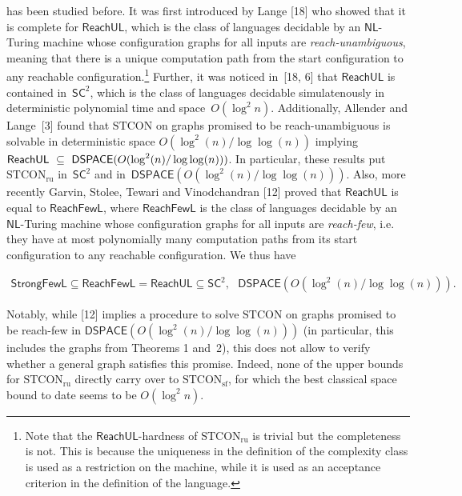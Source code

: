 has been studied before.
It was first introduced by Lange [18] who showed that it is complete for $\mathsf{ReachUL}$, which is the class of languages decidable by an $\mathsf{NL}$-Turing machine whose configuration graphs for all inputs are \emph{reach-unambiguous}, meaning that there is a unique computation path from the start configuration to any reachable configuration.\footnote{Note that the $\mathsf{ReachUL}$-hardness of $\mathrm{STCON}_{\mathrm{ru}}$ is trivial but the completeness is not. This is because the uniqueness in the definition of the complexity class is used as a restriction on the machine, while it is used as an acceptance criterion in the definition of the language.}
Further, it was noticed in [18, 6] that $\mathsf{ReachUL}$ is contained in $\mathsf{SC}^{2}$, which is the class of languages decidable simulatenously in deterministic polynomial time and space $O(\log^{2}n)$.
Additionally, Allender and Lange [3] found that $\mathrm{STCON}$ on graphs promised to be reach-unambiguous is solvable in deterministic space $O(\log^{2}(n)/\log\log(n))$ implying $\mathsf{ReachUL}\nobreak\ \subseteq\nobreak\ \mathsf{DSPACE}(O(\log^{2}(n)/\log\log(n)))$.
In particular, these results put $\mathrm{STCON}_{\mathrm{ru}}$ in $\mathsf{SC}^{2}$ and in $\mathsf{DSPACE}(O(\log^{2}(n)/\log\log(n)))$.
Also, more recently Garvin, Stolee, Tewari and Vinodchandran [12] proved that $\mathsf{ReachUL}$ is equal to $\mathsf{ReachFewL}$, where $\mathsf{ReachFewL}$ is the class of languages decidable by an $\mathsf{NL}$-Turing machine whose configuration graphs for all inputs are \emph{reach-few}, i.e. they have at most polynomially many computation paths from its start configuration to any reachable configuration.
We thus have\par


\[\begin{gathered}
\displaystyle\mathsf{StrongFewL}\subseteq\mathsf{ReachFewL}=\mathsf{ReachUL}\subseteq\mathsf{SC}^{2},\text{ }\mathsf{DSPACE}(O(\log^{2}(n)/\log\log(n))).
\end{gathered}\]


Notably, while [12] implies a procedure to solve $\mathrm{STCON}$ on graphs promised to be reach-few in $\mathsf{DSPACE}(O(\log^{2}(n)/\log\log(n)))$ (in particular, this includes the graphs from Theorems 1 and 2), this does not allow to verify whether a general graph satisfies this promise.
Indeed, none of the upper bounds for $\mathrm{STCON}_{\mathrm{ru}}$ directly carry over to $\mathrm{STCON}_{\mathrm{sf}}$, for which the best classical space bound to date seems to be $O(\log^{2}n)$.\par





